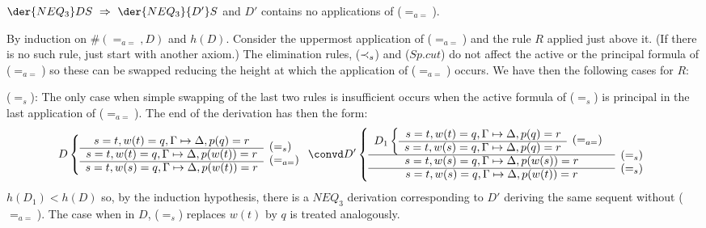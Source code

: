 %
\begin{LEMMA}\label{le:noeqeq}
 $\der{NEQ_3}DS\ \impl\ \der{NEQ_3}{D'}S$ and $D'$ contains no applications
 of ($=_{a=}$).
\end{LEMMA}
\begin{PROOF}
By induction on $\#(=_{a=},D)$ and $h(D)$. Consider the uppermost application of
($=_{a=}$) and the rule $R$ applied just above it. (If there is no such rule,
just start with another axiom.) The elimination rules, ($\mathbin{\prec}_s$) and ($Sp.cut$) do not affect
the active or the principal formula of ($=_{a=}$) so these can be swapped
reducing the height at which the application of ($=_{a=}$) occurs. We have
then the following cases for $R$:
\begin{LS}
\item ($=_s$): The only case when simple swapping of the last two rules is
insufficient occurs when
the active formula of ($=_s$) is principal in the last application of
($=_{a=}$). 
The end of the derivation has then the form:
%
\[D \left\{ \begin{array}{cl}
s=t, w(t)=q,\Gamma \Seq \Delta, p(q)=r  & 
  \raisebox{-1.2ex}[1.5ex][0ex]{($=_s$)} \\ \cline{1-1}
s=t, w(t)=q,\Gamma \Seq \Delta, p(w(t))=r & 
\raisebox{-1.2ex}[1.5ex][0ex]{($=_{a=}$)} \\ \cline{1-1}
s=t, w(s)=q, \Gamma \Seq\Delta, p(w(t))=r
\end{array} \right. \convd
%
%
 D' \left \{ \begin{array}{cl}
D_1 \left\{ \begin{array}{rl}
s=t, w(t)=q, \Gamma \Seq\Delta, p(q)=r  & 
  \raisebox{-1.2ex}[1.5ex][0ex]{($=_{a=}$)} \\ \cline{1-1}
s=t, w(s)=q,\Gamma \Seq\Delta, p(q)=r  & 
\end{array} \right.
\\ \cline{1-1}
s=t, w(s)=q, \Gamma \Seq\Delta, p(w(s))=r & \raisebox{1.2ex}[1ex][0ex]{($=_s$)} \\ \cline{1-1}
s=t, w(s)=q, \Gamma \Seq\Delta, p(w(t))=r & 
\raisebox{1.2ex}[1ex][0ex]{($=_s$)} 
\end{array}  \right . \]
%
$h(D_1) < h(D)$ so, by the induction hypothesis, there is a $NEQ_3$ derivation
corresponding to $D'$ deriving the same  sequent without ($=_{a=}$). 
The case when in  $D$, ($=_s$) replaces $w(t)$ by $q$ is treated analogously.

\end{LS}
\end{PROOF}
